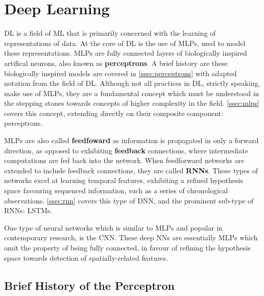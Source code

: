 \section{Deep Learning\label{sec:DL}}
\Gls{DL} is a field of \gls{ML} that is primarily concerned with the learning of
representations of data. At the core of \gls{DL} is the use of \glspl{MLP}, used
to model these representations. \Glspl{MLP} are fully connected layers of
biologically inspired artifical neurons, also known as \textbf{perceptrons}. A
brief history are these biologically inspired models are covered in
\autoref{ssec:perceptrons} with adapted notation from the field of \gls{DL}.
Although not all practices in \gls{DL}, strictly speaking, make use of
\glspl{MLP}, they are a fundamental concept which must be understood in the
stepping stones towards concepts of higher complexity in the field.
\autoref{ssec:mlps} covers this concept, extending directly on their composite
component: perceptrons.

\Glspl{MLP} are also called \textbf{feedfoward} as information is propagated in
only a forward direction, as opposed to exhibiting \textbf{feedback} connections,
where intermediate computations are fed back into the network. When feedforward
networks are extended to include feedback connections, they are called
\textbf{\glspl{RNN}}. These types of networks excel at learning temporal
features, exhibiting a refined hypothesis space favouring sequenced information,
such as a series of chronological observations. \autoref{ssec:rnn} covers this
type of \gls{DNN}, and the prominent sub-type of \glspl{RNN}: \glspl{LSTM}.

One type of neural networks which is similar to \glspl{MLP} and popular in
contemporary research, is the \gls{CNN}. These deep \glspl{NN} are essentially
\glspl{MLP} which omit the property of being fully connected, in favour of
refining the hypothesis space towards detection of spatially-related features.


\subsection{Brief History of the Perceptron\label{ssec:perceptrons}}

